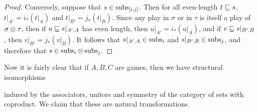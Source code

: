 \documentclass[11pt]{report}
\begin{document}
\begin{proof}
  Conversely, suppose that $s\in\operatorname{subs}_{[i,j]}$.  
  Then for all even-length $t\sqsubseteq s$, $t\vert_{A'}=i_*(t\vert_{A})$ and $t\vert_{B'}=j_*(t\vert_{B})$.  
  Since any play in $\sigma$ or in $\tau$ is itself a play of $\sigma\otimes\tau$, then if $u\sqsubseteq s\vert_{A',A}$ has even length, then $u\vert_{A'}=i_*(u\vert_{A})$, and if $v\sqsubseteq s\vert_{B',B}$, then $v\vert_{B'}=j_*(v\vert_{B})$.  
  It follows that $s\vert_{A',A}\in \operatorname{subs}_i$ and $s\vert_{B',B}\in\operatorname{subs}_j$, and therefore that $s\in \operatorname{subs}_i\otimes\operatorname{subs}_j$.  
\end{proof}

Now it is fairly clear that if $A,B,C$ are games, then we have structural isomorphisms
induced by the associators, unitors and symmetry of the category of sets with coproduct.
We claim that these are natural transformations.
\end{document}
